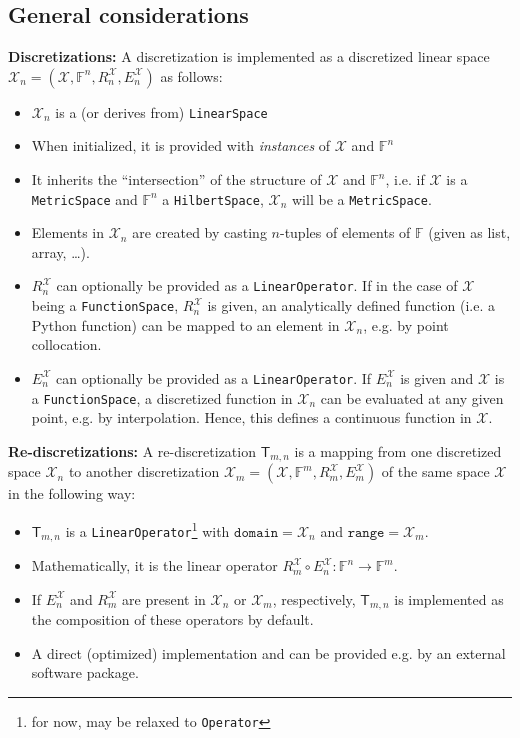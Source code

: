 \documentclass[a4paper]{paper}
\newcommand{\VecSpace}[1]{\mathscr{#1}}
\newcommand{\Field}{\mathbb{F}}
\newcommand{\DiscOp}[1]{\mathsf{#1}}
\newcommand*{\EXT}[2]{\ensuremath{E_{#1}^{#2}}}
\newcommand*{\REST}[2]{\ensuremath{R_{#1}^{#2}}}
\newcommand*{\RnX}{\ensuremath{\REST{n}{\VecSpace{X}}}}
\newcommand*{\RmX}{\ensuremath{\REST{m}{\VecSpace{X}}}}
\newcommand*{\EnX}{\ensuremath{\EXT{n}{\VecSpace{X}}}}
\newcommand*{\EmX}{\ensuremath{\EXT{m}{\VecSpace{X}}}}
\begin{document}
\subsection{General considerations}
%
\textbf{Discretizations:}
A discretization is implemented as a discretized linear space $\VecSpace{X}_n = (\VecSpace{X}, \Field^n, \RnX, \EnX)$ as follows:
%
\begin{itemize}
 \item $\VecSpace{X}_n$ is a (or derives from) \texttt{LinearSpace}
 \item When initialized, it is provided with \emph{instances} of $\VecSpace{X}$ and $\Field^n$
 \item It inherits the ``intersection'' of the structure of $\VecSpace{X}$ and $\Field^n$, i.e. if $\VecSpace{X}$ is a 
 \texttt{MetricSpace} and $\Field^n$ a \texttt{HilbertSpace}, $\VecSpace{X}_n$ will be a \texttt{MetricSpace}.
 \item Elements in $\VecSpace{X}_n$ are created by casting $n$-tuples of elements of $\Field$ (given as list, array, \ldots).
 \item $\RnX$ can optionally be provided as a \texttt{LinearOperator}. If in the case of $\VecSpace{X}$ being a \texttt{FunctionSpace}, 
 $\RnX$ is given, an analytically defined function (i.e. a   Python function) can be mapped to an element in $\VecSpace{X}_n$, e.g. by 
 point collocation.
 \item $\EnX$ can optionally be provided as a \texttt{LinearOperator}. If $\EnX$ is given and $\VecSpace{X}$ is a \texttt{FunctionSpace}, 
 a discretized function in $\VecSpace{X}_n$ can be evaluated at any given point, e.g. by interpolation. Hence, this defines a continuous 
 function in $\VecSpace{X}$.
\end{itemize}
%
\textbf{Re-discretizations:}
A re-discretization $\DiscOp{T}_{m,n}$ is a mapping from one discretized space $\VecSpace{X}_n$ to another discretization 
$\VecSpace{X}_m = (\VecSpace{X}, \Field^m, \RmX, \EmX)$ of the same space $\VecSpace{X}$ in the following way:
%
\begin{itemize}
 \item $\DiscOp{T}_{m,n}$ is a \texttt{LinearOperator}\footnote{for now, may be relaxed to \texttt{Operator}} with 
 $\mathtt{domain} = \VecSpace{X}_n$ and $\mathtt{range} = \VecSpace{X}_m$.
 \item Mathematically, it is the linear operator $\RmX \circ \EnX: \Field^n \to \Field^m$.
 \item If $\EnX$ and $\RmX$ are present in $\VecSpace{X}_n$ or $\VecSpace{X}_m$, respectively, $\DiscOp{T}_{m,n}$ is implemented as the 
 composition of these operators by default.
 \item A direct (optimized) implementation and can be provided e.g. by an external software package.
\end{itemize}
\end{document}

